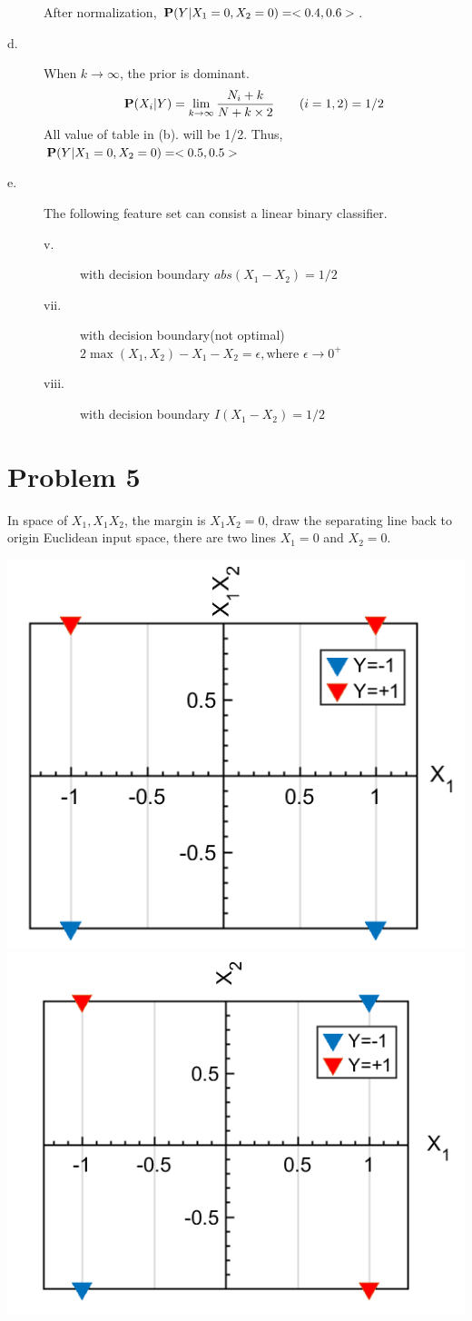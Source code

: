 \documentclass{mcmthesis}
\begin{document}
\begin{description}
	After normalization,  $\mathbf{P}(Y|X_1=0,X_2=0)=<0.4,0.6>$. 
	\item[d.] When $k \rightarrow \infty $, the prior is dominant. $${\mathbf{P}(X_i|Y)}=\lim_{k\rightarrow \infty} {\frac {N_{i}+k }{N+ k \times 2}}\qquad (i=1,2) =1/2 $$
	All value of table in {(b).} will be 1/2. Thus, $\mathbf{P}(Y|X_1=0,X_2=0)=<0.5,0.5>$
	\item[e.] The following feature set can consist a linear binary classifier. 
	\begin{description}
		\item[v.] with decision boundary $abs(X_1-X_2)=1/2$
		\item[vii.] with decision boundary(not optimal) $2\max(X_1,X_2)-X_1-X_2=\epsilon, \text{where } \epsilon \rightarrow 0^{+}$
		\item[viii.] with decision boundary $I(X_1-X_2)=1/2$
	\end{description}
\end{description}

\section{Problem 5}
In space of ${X_1, X_1X_2}$, the margin is $X_1X_2=0$, draw the separating line back to origin Euclidean input space, there are two lines $X_1=0$ and $X_2=0$.

\includegraphics[width=.48\columnwidth]{1.png}
\includegraphics[width=.5\columnwidth]{2.png}
%
	
\end{document}
